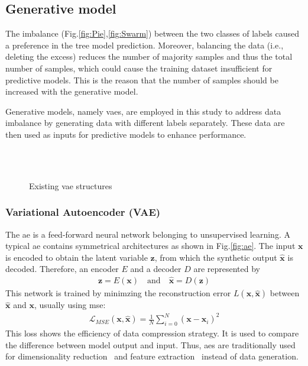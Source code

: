 \documentclass[twoside,twocolumn,9pt]{article}
\begin{document}
\subsection{Generative model} \label{mtd:generative}
The imbalance (Fig.\ref{fig:Pie},\ref{fig:Swarm}) between the two classes of labels caused a preference in the tree model prediction. Moreover, balancing the data (i.e., deleting the excess) reduces the number of majority samples and thus the total number of samples, which could cause the training dataset insufficient for predictive models. This is the reason that the number of samples should be increased with the generative model. 

Generative models, namely \acrlong*{vae}s, are employed in this study to address data imbalance by generating data with different labels separately. These data are then used as inputs for predictive models to enhance performance. 
\begin{figure}[!htb]
    \begin{flushleft}
    \\
    \\
    \caption{Existing \acrshort*{vae} structures}
    \end{flushleft}
\end{figure}
\subsubsection{Variational Autoencoder (VAE)}\label{mtd:vae}
The \acrfull*{ae} is a feed-forward neural network belonging to unsupervised learning\cite{kramer1991nonlinear}. A typical \acrshort*{ae} contains symmetrical architectures as shown in Fig.\ref{fig:ae}. The input $\mathbf{x}$ is encoded to obtain the latent variable $\mathbf{z}$, from which the synthetic output $\hat{\mathbf{x}}$ is decoded. Therefore, an encoder $E$ and a decoder $D$ are represented by
\begin{align} \label{eq:MSE}
    \mathbf{z} = E(\mathbf{x}) \quad \textrm {and} \quad  \hat{\mathbf{x}} = D(\mathbf{z})
\end{align}
This network is trained by minimzing the reconstruction error $L(\mathbf{x}, \hat{\mathbf{x}})$ between  $\hat{\mathbf{x}}$ and $\mathbf{x}$,  usually using \acrfull*{mse}:  
\begin{align}
    \mathcal{L}_{MSE}(\mathbf{x}, \hat{\mathbf{x}})=\frac{1}{N} \sum_{i=0}^N\left(\mathbf{x}-\hat{\mathbf{x}}_i\right)^2
\end{align}
This loss shows the efficiency of data compression strategy. It is used to compare the difference between model output and input. Thus, \acrshort*{ae}s are traditionally used for dimensionality reduction~\cite{cheng2023generalised,cheng2022data} and feature extraction~\cite{yousefi2017autoencoder} instead of data generation. 
\end{document}

